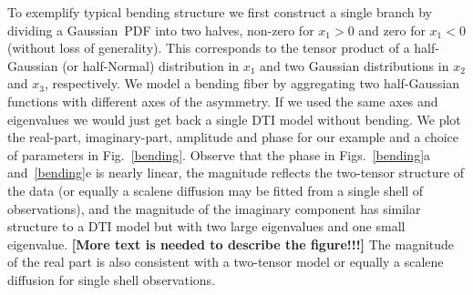 \documentclass[authoryear,preprint,12pt]{elsarticle}
\begin{document}
To exemplify typical bending structure we first construct a single
branch by dividing a Gaussian~PDF into two halves, non-zero for
$x_1>0$ and zero for $x_1<0$ (without loss of generality).  This
corresponds to the tensor product of a half-Gaussian (or half-Normal)
distribution in $x_1$ and two Gaussian distributions in $x_2$ and
$x_3$, respectively.  We model a bending fiber by aggregating two
half-Gaussian functions with different axes of the asymmetry.  If we
used the same axes and eigenvalues we would just get back a single DTI
model without bending.  We plot the real-part, imaginary-part,
amplitude and phase for our example and a choice of parameters in
Fig.~\ref{bending}.  Observe that the phase in Figs.~\ref{bending}a
and~\ref{bending}e is nearly linear, the magnitude reflects the
two-tensor structure of the data (or equally a scalene diffusion may
be fitted from a single shell of observations), and the magnitude of
the imaginary component has similar structure to a DTI model but with
two large eigenvalues and one small eigenvalue.  \textbf{[More text is
    needed to describe the figure!!!]}  The magnitude of the real part
is also consistent with a two-tensor model or equally a scalene
diffusion for single shell observations.
\end{document}
